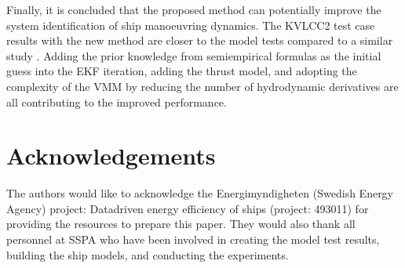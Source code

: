 \documentclass[review]{elsarticle}
\begin{document}
  
Finally, it is concluded that the proposed method can potentially improve the system identification of ship manoeuvring dynamics. The KVLCC2 test case results with the new method are closer to the model tests compared to a similar study \cite{he_nonparametric_2022}. Adding the prior knowledge from semi\sphinxhyphen{}empirical formulas as the initial guess into the EKF iteration, adding the thrust model, and adopting the complexity of the VMM by reducing the number of hydrodynamic derivatives are all contributing to the improved performance.


\section{Acknowledgements}
\label{\detokenize{acknowledgements:acknowledgements}}\label{\detokenize{acknowledgements::doc}}
  
The authors would like to acknowledge the Energimyndigheten (Swedish Energy Agency) project: Data\sphinxhyphen{}driven energy efficiency of ships (project: 49301\sphinxhyphen{}1) for providing the resources to prepare this paper. They would also thank all personnel at SSPA who have been involved in creating the model test results, building the ship models, and conducting the experiments.
\label{\detokenize{bibligraphy:id1}}







\renewcommand{\indexname}{Index}


\end{document}

